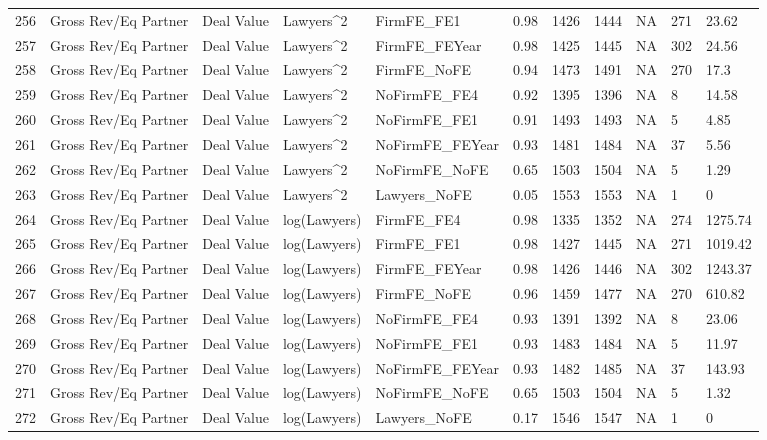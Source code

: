 \begin{table}[ht]
\begin{tabular}{rllllllllll}
  256 & Gross Rev/Eq Partner & Deal Value & Lawyers^2 & FirmFE\_FE1 & 0.98 & 1426 & 1444 & NA & 271 & 23.62 \\ 
  257 & Gross Rev/Eq Partner & Deal Value & Lawyers^2 & FirmFE\_FEYear & 0.98 & 1425 & 1445 & NA & 302 & 24.56 \\ 
  258 & Gross Rev/Eq Partner & Deal Value & Lawyers^2 & FirmFE\_NoFE & 0.94 & 1473 & 1491 & NA & 270 & 17.3 \\ 
  259 & Gross Rev/Eq Partner & Deal Value & Lawyers^2 & NoFirmFE\_FE4 & 0.92 & 1395 & 1396 & NA & 8 & 14.58 \\ 
  260 & Gross Rev/Eq Partner & Deal Value & Lawyers^2 & NoFirmFE\_FE1 & 0.91 & 1493 & 1493 & NA & 5 & 4.85 \\ 
  261 & Gross Rev/Eq Partner & Deal Value & Lawyers^2 & NoFirmFE\_FEYear & 0.93 & 1481 & 1484 & NA & 37 & 5.56 \\ 
  262 & Gross Rev/Eq Partner & Deal Value & Lawyers^2 & NoFirmFE\_NoFE & 0.65 & 1503 & 1504 & NA & 5 & 1.29 \\ 
  263 & Gross Rev/Eq Partner & Deal Value & Lawyers^2 & Lawyers\_NoFE & 0.05 & 1553 & 1553 & NA & 1 & 0 \\ 
  264 & Gross Rev/Eq Partner & Deal Value & log(Lawyers) & FirmFE\_FE4 & 0.98 & 1335 & 1352 & NA & 274 & 1275.74 \\ 
  265 & Gross Rev/Eq Partner & Deal Value & log(Lawyers) & FirmFE\_FE1 & 0.98 & 1427 & 1445 & NA & 271 & 1019.42 \\ 
  266 & Gross Rev/Eq Partner & Deal Value & log(Lawyers) & FirmFE\_FEYear & 0.98 & 1426 & 1446 & NA & 302 & 1243.37 \\ 
  267 & Gross Rev/Eq Partner & Deal Value & log(Lawyers) & FirmFE\_NoFE & 0.96 & 1459 & 1477 & NA & 270 & 610.82 \\ 
  268 & Gross Rev/Eq Partner & Deal Value & log(Lawyers) & NoFirmFE\_FE4 & 0.93 & 1391 & 1392 & NA & 8 & 23.06 \\ 
  269 & Gross Rev/Eq Partner & Deal Value & log(Lawyers) & NoFirmFE\_FE1 & 0.93 & 1483 & 1484 & NA & 5 & 11.97 \\ 
  270 & Gross Rev/Eq Partner & Deal Value & log(Lawyers) & NoFirmFE\_FEYear & 0.93 & 1482 & 1485 & NA & 37 & 143.93 \\ 
  271 & Gross Rev/Eq Partner & Deal Value & log(Lawyers) & NoFirmFE\_NoFE & 0.65 & 1503 & 1504 & NA & 5 & 1.32 \\ 
  272 & Gross Rev/Eq Partner & Deal Value & log(Lawyers) & Lawyers\_NoFE & 0.17 & 1546 & 1547 & NA & 1 & 0 \\ 

\end{tabular}
\end{table}
